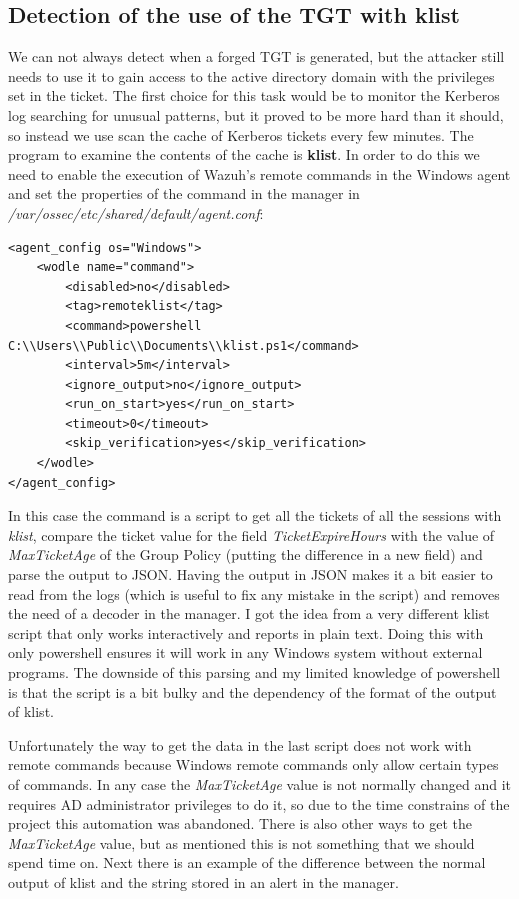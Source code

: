 \subsection{Detection of the use of the TGT with klist}
We can not always detect when a forged TGT is generated, but the attacker still needs to use it to gain access to the active directory domain with the privileges set in the ticket. The first choice for this task would be to monitor the Kerberos log searching for unusual patterns, but it proved to be more hard than it should, so instead we use scan the cache of Kerberos tickets every few minutes.
\linej
The program to examine the contents of the cache is \textbf{klist}.
\linej
\linej
In order to do this we need to enable the execution of Wazuh's remote commands in the Windows agent and set the properties of the command in the manager in \textit{/var/ossec/etc/shared/default/agent.conf}\cite{wazuh_remote_command}:
\linej
\begin{lstlisting}[style=xml]
<agent_config os="Windows">
	<wodle name="command">
		<disabled>no</disabled>
		<tag>remoteklist</tag>
		<command>powershell C:\\Users\\Public\\Documents\\klist.ps1</command>
		<interval>5m</interval>
		<ignore_output>no</ignore_output>
		<run_on_start>yes</run_on_start>
		<timeout>0</timeout>
		<skip_verification>yes</skip_verification>
	</wodle>
</agent_config>
\end{lstlisting}
\linej
In this case the command is a script to get all the tickets of all the sessions with \textit{klist}, compare the ticket value for the field \textit{TicketExpireHours} with the value of \textit{MaxTicketAge} of the Group Policy (putting the difference in a new field) and parse the output to JSON. Having the output in JSON makes it a bit easier to read from the logs (which is useful to fix any mistake in the script) and removes the need of a decoder in the manager. I got the idea from a very different klist script that only works interactively and reports in plain text\cite{klist_script_idea}.
\linej
Doing this with only powershell ensures it will work in any Windows system without external programs. The downside of this parsing and my limited knowledge of powershell is that the script is a bit bulky and the dependency of the format of the output of klist.
\linej


Unfortunately the way to get the data in the last script does not work with remote commands because Windows remote commands only allow certain types of commands. In any case the \textit{MaxTicketAge} value is not normally changed and it requires AD administrator privileges to do it, so due to the time constrains of the project this automation was abandoned. There is also other ways to get the \textit{MaxTicketAge} value, but as mentioned this is not something that we should spend time on.
\linej
\linej
Next there is an example of the difference between the normal output of klist and the string stored in an alert in the manager.

